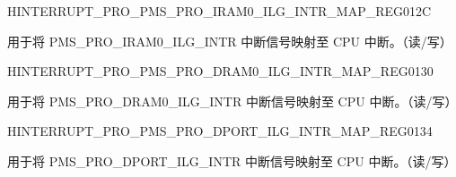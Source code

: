 \begin{register}{H}{INTERRUPT\_PRO\_PMS\_PRO\_IRAM0\_ILG\_INTR\_MAP\_REG}{\hexprefix{}012C}\label{regdesc:INTERRUPTPROPMSPROIRAM0ILGINTRMAPREG}
%
%
\regnewline%
\begin{regdesc}\begin{reglist}
\label{fielddesc:INTERRUPTPROPMSPROIRAM0ILGINTRMAP}\item [INTERRUPT\_PRO\_PMS\_PRO\_IRAM0\_ILG\_INTR\_MAP] 用于将 PMS\_PRO\_IRAM0\_ILG\_INTR 中断信号映射至 CPU 中断。（读/写）
\end{reglist}\end{regdesc}
\end{register}


\begin{register}{H}{INTERRUPT\_PRO\_PMS\_PRO\_DRAM0\_ILG\_INTR\_MAP\_REG}{\hexprefix{}0130}\label{regdesc:INTERRUPTPROPMSPRODRAM0ILGINTRMAPREG}
%
%
\regnewline%
\begin{regdesc}\begin{reglist}
\label{fielddesc:INTERRUPTPROPMSPRODRAM0ILGINTRMAP}\item [INTERRUPT\_PRO\_PMS\_PRO\_DRAM0\_ILG\_INTR\_MAP] 用于将 PMS\_PRO\_DRAM0\_ILG\_INTR 中断信号映射至 CPU 中断。（读/写）
\end{reglist}\end{regdesc}
\end{register}


\begin{register}{H}{INTERRUPT\_PRO\_PMS\_PRO\_DPORT\_ILG\_INTR\_MAP\_REG}{\hexprefix{}0134}\label{regdesc:INTERRUPTPROPMSPRODPORTILGINTRMAPREG}
%
%
\regnewline%
\begin{regdesc}\begin{reglist}
\label{fielddesc:INTERRUPTPROPMSPRODPORTILGINTRMAP}\item [INTERRUPT\_PRO\_PMS\_PRO\_DPORT\_ILG\_INTR\_MAP] 用于将 PMS\_PRO\_DPORT\_ILG\_INTR 中断信号映射至 CPU 中断。（读/写）
\end{reglist}\end{regdesc}
\end{register}


